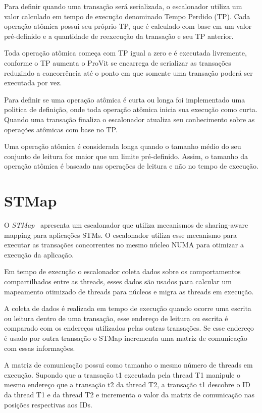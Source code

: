 \documentclass[diss,capa]{texufpel}
\begin{document}
Para definir quando uma transação será serializada, o escalonador utiliza um valor calculado em tempo de execução denominado Tempo Perdido (TP). Cada operação atômica possui seu próprio TP, que é calculado com base em um valor pré-definido e a quantidade de reexecução da transação e seu TP anterior.

Toda operação atômica começa com TP igual a zero e é executada livremente, conforme o TP aumenta o ProVit se encarrega de serializar as transações reduzindo a concorrência até o ponto em que somente uma transação poderá ser executada por vez.

Para definir se uma operação atômica é curta ou longa foi implementado uma politica de definição, onde toda operação atômica inicia sua execução como curta. Quando uma transação finaliza o escalonador atualiza seu conhecimento sobre as operações atômicas com base no TP.

Uma operação atômica é considerada longa quando o tamanho médio do seu conjunto de leitura for maior que um limite pré-definido. Assim, o tamanho da operação atômica é baseado nas operações de leitura e não no tempo de execução.

\section{STMap}

O \emph{STMap}~\cite{pasqualin2020online} apresenta um escalonador que utiliza mecanismos de sharing-aware mapping para aplicações STMs. O escalonador utiliza esse mecanismo para executar as transações concorrentes no mesmo núcleo NUMA para otimizar a execução da aplicação.

Em tempo de execução o escalonador coleta dados sobre os comportamentos compartilhados entre as threads, esses dados são usados para calcular um mapeamento otimizado de threads para núcleos e migra as threads em execução.

A coleta de dados é realizada em tempo de execução quando ocorre uma escrita ou leitura dentro de uma transação, esse endereço de leitura ou escrita é comparado com os endereços utilizados pelas outras transações. Se esse endereço é usado por outra transação o STMap incrementa uma matriz de comunicação com essas informações.

A matriz de comunicação possui como tamanho o mesmo número de threads em execução. Supondo que a transação t1 executada pela thread T1 manipule o mesmo endereço que a transação t2 da thread T2, a transação t1 descobre o ID da thread T1 e da thread T2 e incrementa o valor da matriz de comunicação nas posições respectivas aos IDs.
\end{document}
